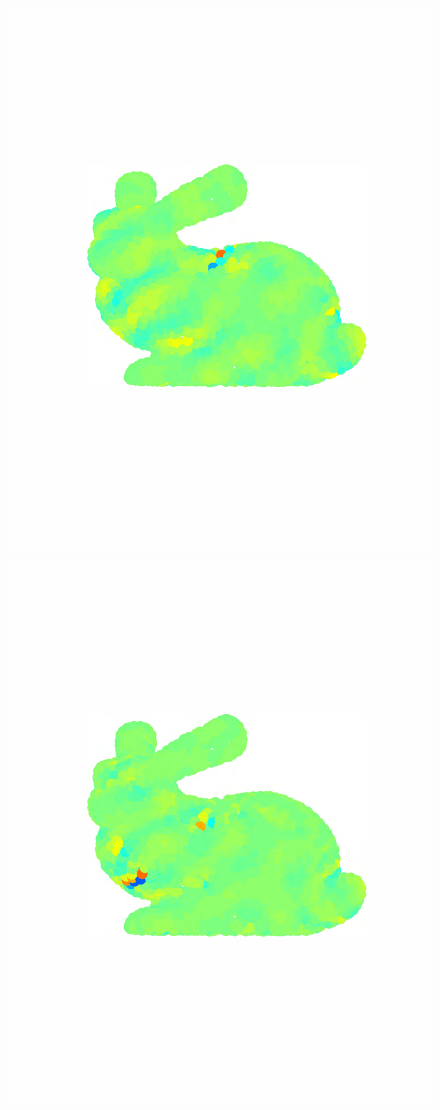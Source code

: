 \documentclass[journal, 10pt]{IEEEtran}
\begin{document}
\begin{figure}[bth]
\begin{minipage}[m]{0.16\linewidth}
\end{minipage}
\begin{minipage}[m]{0.16\linewidth}
\centerline{\includegraphics[width=.8\linewidth]{fig_bunny_rec_wav1}}
\end{minipage}
\begin{minipage}[m]{0.16\linewidth}
\centerline{\includegraphics[width=.8\linewidth]{fig_bunny_rec_wav2}}

\end{minipage}
\end{figure}
\end{document}

